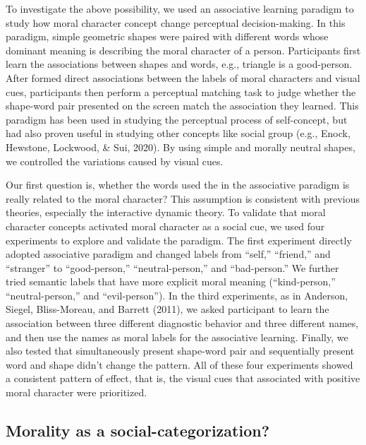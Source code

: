 \documentclass[
  english,
  man]{apa6}
\begin{document}
To investigate the above possibility, we used an associative learning paradigm to study how moral character concept change perceptual decision-making. In this paradigm, simple geometric shapes were paired with different words whose dominant meaning is describing the moral character of a person. Participants first learn the associations between shapes and words, e.g., triangle is a good-person. After formed direct associations between the labels of moral characters and visual cues, participants then perform a perceptual matching task to judge whether the shape-word pair presented on the screen match the association they learned. This paradigm has been used in studying the perceptual process of self-concept, but had also proven useful in studying other concepts like social group (e.g., Enock, Hewstone, Lockwood, \& Sui, 2020). By using simple and morally neutral shapes, we controlled the variations caused by visual cues.

Our first question is, whether the words used the in the associative paradigm is really related to the moral character? This assumption is consistent with previous theories, especially the interactive dynamic theory. To validate that moral character concepts activated moral character as a social cue, we used four experiments to explore and validate the paradigm. The first experiment directly adopted associative paradigm and changed labels from ``self,'' ``friend,'' and ``stranger'' to ``good-person,'' ``neutral-person,'' and ``bad-person.'' We further tried semantic labels that have more explicit moral meaning (``kind-person,'' ``neutral-person,'' and ``evil-person''). In the third experiments, as in Anderson, Siegel, Bliss-Moreau, and Barrett (2011), we asked participant to learn the association between three different diagnostic behavior and three different names, and then use the names as moral labels for the associative learning. Finally, we also tested that simultaneously present shape-word pair and sequentially present word and shape didn't change the pattern. All of these four experiments showed a consistent pattern of effect, that is, the visual cues that associated with positive moral character were prioritized.

\hypertarget{morality-as-a-social-categorization}{%
\subsection{Morality as a social-categorization?}\label{morality-as-a-social-categorization}}
\end{document}
